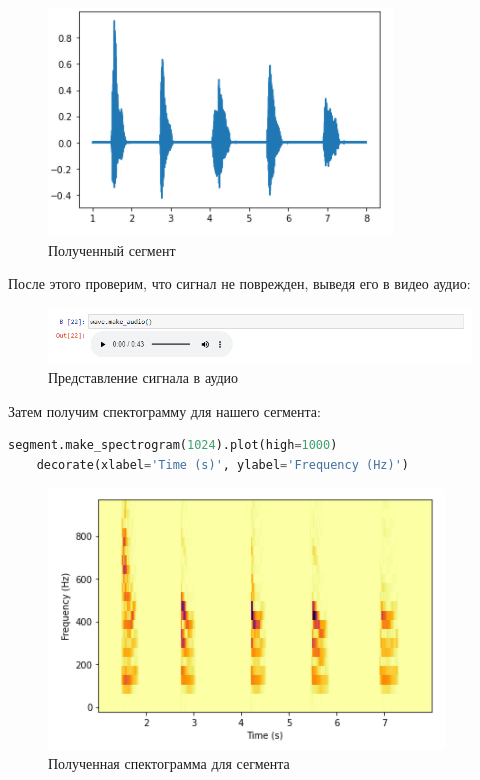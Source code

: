 \documentclass[a4paper]{article}
\begin{document}
             \begin{figure}[H]
                \centering
                \includegraphics{ex_6_wave_segment.png}
                \caption{Полученный сегмент}
                \label{fig:ex_6_wave_segment}
            \end{figure}
            
            После этого проверим, что сигнал не поврежден, выведя его в видео аудио:
            
             \begin{figure}[H]
                \centering
                \includegraphics[width=\textwidth]{ex_6_wave_audio.png}
                \caption{Представление сигнала в аудио}
                \label{fig:ex_6_wave_audio}
            \end{figure}
            
            Затем получим спектограмму для нашего сегмента:
            
\begin{lstlisting}[language=Python, caption= Спектограмма для нашего сегмента]
    segment.make_spectrogram(1024).plot(high=1000)
    decorate(xlabel='Time (s)', ylabel='Frequency (Hz)')
\end{lstlisting}   
            
             \begin{figure}[H]
                \centering
                \includegraphics{ex_6_segment_spectogramma.png}
                \caption{Полученная спектограмма для сегмента}
                \label{fig:ex_6_segment_spectogramma}
            \end{figure}
            
\end{document}
